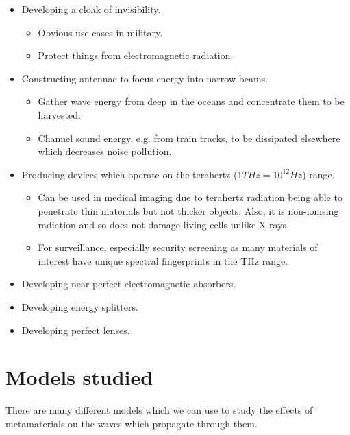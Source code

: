 \begin{itemize}
\item Developing a cloak of invisibility.\cite{emcloak}
      \begin{itemize}
      \item Obvious use cases in military.
      \item Protect things from electromagnetic radiation.
      \end{itemize}
\item Constructing antennae to focus energy into narrow beams.
      \cite{diremi,antennasol}
      \begin{itemize}
      \item Gather wave energy from deep in the oceans and concentrate them to
            be harvested.
      \item Channel sound energy, e.g. from train tracks, to be dissipated
            elsewhere which decreases noise pollution.
      \end{itemize}
\item Producing devices which operate on the terahertz ($1THz=10^{12}Hz$)
      range.\cite{THz}
      \begin{itemize}
      \item Can be used in medical imaging due to terahertz radiation being
            able to penetrate thin materials but not thicker objects. Also, it
            is non-ionising radiation and so does not damage living cells
            unlike X-rays.
      \item For surveillance, especially security screening as many materials
            of interest have unique spectral fingerprints in the THz
            range.\cite{Thzsec}
      \end{itemize}
\item Developing near perfect electromagnetic absorbers.\cite{absorbing}
\item Developing energy splitters.\cite{toposplit}
\item Developing perfect lenses.\cite{negrefraclens}
\end{itemize}

\section{Models studied}
There are many different models which we can use to study the effects of
metamaterials on the waves which propagate through them. 

